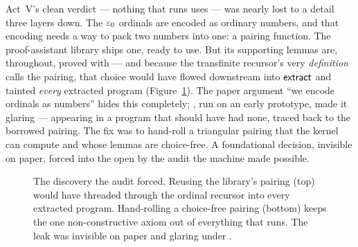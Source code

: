 \documentclass[11pt]{article}
\begin{document}
Act~V's clean verdict --- nothing that runs uses  --- was
nearly lost to a detail three layers down. The $\varepsilon_0$ ordinals are encoded as
ordinary numbers, and that encoding needs a way to pack two numbers into one:
a pairing function. The proof-assistant library ships one, ready to use. But its
supporting lemmas are, throughout, proved with  --- and
because the transfinite recursor's very \emph{definition} calls the pairing,
that choice would have flowed downstream into $\mathsf{extract}$ and tainted
\emph{every} extracted program (Figure~\ref{fig:pair}). The paper argument
``we encode ordinals as numbers'' hides this completely; ,
run on an early prototype, made it glaring ---  appearing
in a program that should have had none, traced back to the borrowed pairing. The
fix was to hand-roll a triangular pairing that the kernel can compute and whose
lemmas are choice-free. A foundational decision, invisible on paper, forced into
the open by the audit the machine made possible.

\begin{figure}[h]
\centering
{}
\caption{The discovery the audit forced. Reusing the library's pairing (top)
would have threaded  through the ordinal recursor into
every extracted program. Hand-rolling a choice-free pairing (bottom) keeps the
one non-constructive axiom out of everything that runs. The leak was invisible
on paper and glaring under .}
\label{fig:pair}
\end{figure}
\end{document}
